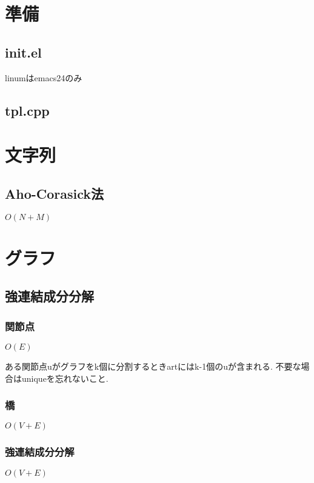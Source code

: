 \documentclass[9pt,twocolumn,a4paper,landscape]{extarticle}
\begin{document}
\tableofcontents
\newpage
%
%
\section{準備}
\subsection{init.el}
linumはemacs24のみ\par


\subsection{tpl.cpp}


\section{文字列}
\subsection{Aho-Corasick法}
$O(N+M)$\par


\section{グラフ}
\subsection{強連結成分分解}
\subsubsection{関節点}
$O(E)$\par
ある関節点uがグラフをk個に分割するときartにはk-1個のuが含まれる. 不要な場合はuniqueを忘れないこと.\par


\subsubsection{橋}
$O(V+E)$\par


\subsubsection{強連結成分分解}
$O(V+E)$\par

\end{document}
